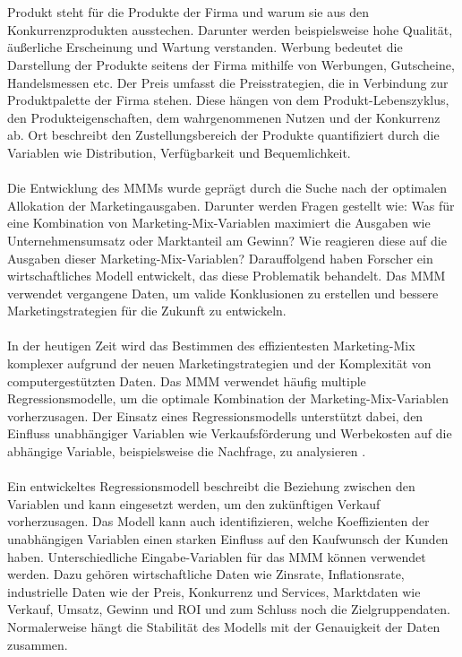 \\\\Produkt steht für die Produkte der Firma und warum sie aus den Konkurrenzprodukten ausstechen. Darunter werden beispielsweise hohe Qualität, äußerliche Erscheinung und Wartung verstanden. Werbung bedeutet die Darstellung der Produkte seitens der Firma mithilfe von Werbungen, Gutscheine, Handelsmessen etc. Der Preis umfasst die Preisstrategien, die in Verbindung zur Produktpalette der Firma stehen. Diese hängen von dem Produkt-Lebenszyklus, den Produkteigenschaften, dem wahrgenommenen Nutzen und der Konkurrenz ab. Ort beschreibt den Zustellungsbereich der Produkte quantifiziert durch die Variablen wie Distribution, Verfügbarkeit und Bequemlichkeit\cite{akinkunmi2018data}. \\\\
Die Entwicklung des \ac{MMM}s wurde geprägt durch die Suche nach der optimalen Allokation der Marketingausgaben. Darunter werden Fragen gestellt wie: Was für eine Kombination von Marketing-Mix-Variablen maximiert die Ausgaben wie Unternehmensumsatz oder Marktanteil am Gewinn? Wie reagieren diese auf die Ausgaben dieser Marketing-Mix-Variablen? Darauffolgend haben Forscher ein wirtschaftliches Modell entwickelt, das diese Problematik behandelt. Das \ac{MMM} verwendet vergangene Daten, um valide Konklusionen zu erstellen und bessere Marketingstrategien für die Zukunft zu entwickeln.\\\\
In der heutigen Zeit wird das Bestimmen des effizientesten Marketing-Mix komplexer aufgrund der neuen Marketingstrategien und der Komplexität von computergestützten Daten. Das \ac{MMM} verwendet häufig multiple Regressionsmodelle, um die optimale Kombination der Marketing-Mix-Variablen vorherzusagen. Der Einsatz eines Regressionsmodells unterstützt dabei, den Einfluss unabhängiger Variablen wie Verkaufsförderung und Werbekosten auf die abhängige Variable, beispielsweise die Nachfrage, zu analysieren \cite{akinkunmi2018data}.\\\\
Ein entwickeltes Regressionsmodell beschreibt die Beziehung zwischen den Variablen und kann eingesetzt werden, um den zukünftigen Verkauf vorherzusagen. Das Modell kann auch identifizieren, welche Koeffizienten der unabhängigen Variablen einen starken Einfluss auf den Kaufwunsch der Kunden haben. Unterschiedliche Eingabe-Variablen für das \ac{MMM} können verwendet werden. Dazu gehören wirtschaftliche Daten wie Zinsrate, Inflationsrate, industrielle Daten wie der Preis, Konkurrenz und Services, Marktdaten wie Verkauf, Umsatz, Gewinn und \ac{ROI} und zum Schluss noch die Zielgruppendaten. Normalerweise hängt die Stabilität des Modells mit der Genauigkeit der Daten zusammen. 

